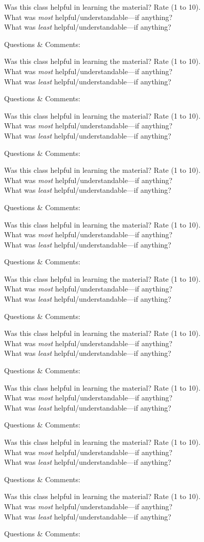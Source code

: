 \documentclass[avery5371,grid]{flashcards}
\newcommand{\commentcard}{
	\begin{flashcard}{\normalfont

\small Was this class helpful in learning the material? Rate (1 to 10). \\[1.1cm]
\small What was \emph{most} helpful/understandable---if anything? \\[1.1cm]
\small What was \emph{least} helpful/understandable---if anything? \\[1.1cm]
}

Questions \& Comments: 
	\end{flashcard}
}
\begin{document}
\commentcard
\commentcard
\commentcard
\commentcard
\commentcard
\commentcard
\commentcard
\commentcard
\commentcard
\commentcard
\end{document}
